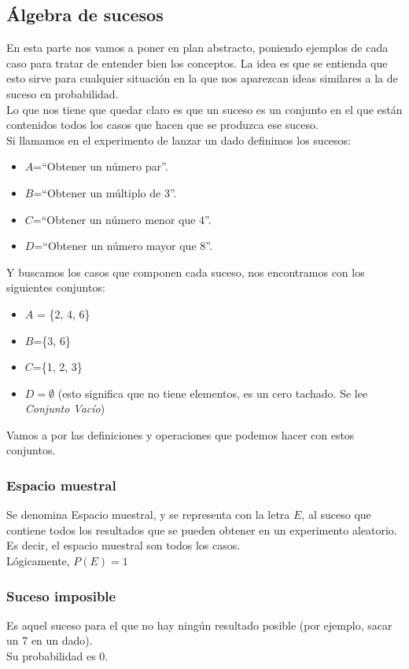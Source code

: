 \documentclass[a4paper,10pt,answers]{exam}
\begin{document}
\subsection{Álgebra de sucesos}
En esta parte nos vamos a poner en plan abstracto, poniendo ejemplos de cada caso para tratar de entender bien los conceptos. La idea es que se entienda que esto sirve para cualquier situación en la que nos aparezcan ideas similares a la de suceso en probabilidad.\\

Lo que nos tiene que quedar claro es que un suceso es un conjunto en el que están contenidos todos los casos que hacen que se produzca ese suceso.\\
Si llamamos en el experimento de lanzar un dado definimos los sucesos:
\begin{itemize}
	\item $A$=``Obtener un número par''.
	\item $B$=``Obtener un múltiplo de 3''.
	\item $C$=``Obtener un número menor que 4''.
	\item $D$=``Obtener un número mayor que 8''.
\end{itemize}
Y buscamos los casos que componen cada suceso, nos encontramos con los siguientes conjuntos:
\begin{itemize}
	\item $A$ = \{2, 4, 6\}
	\item $B$=\{3, 6\}
	\item $C$=\{1, 2, 3\}
	\item$D=\emptyset$ (esto significa que no tiene elementos, es un cero tachado. Se lee \emph{Conjunto Vacío})
\end{itemize}
Vamos a por las definiciones y operaciones que podemos hacer con estos conjuntos.
\subsubsection{Espacio muestral}
Se denomina Espacio muestral, y se representa con la letra $E$, al suceso que contiene todos los resultados que se pueden obtener en un experimento aleatorio.\\
Es decir, el espacio muestral son todos los casos.\\

Lógicamente, $P(E) = 1$
\subsubsection{Suceso imposible}
Es aquel suceso para el que no hay ningún resultado posible (por ejemplo, sacar un 7 en un dado).\\
Su probabilidad es 0.
\end{document}
